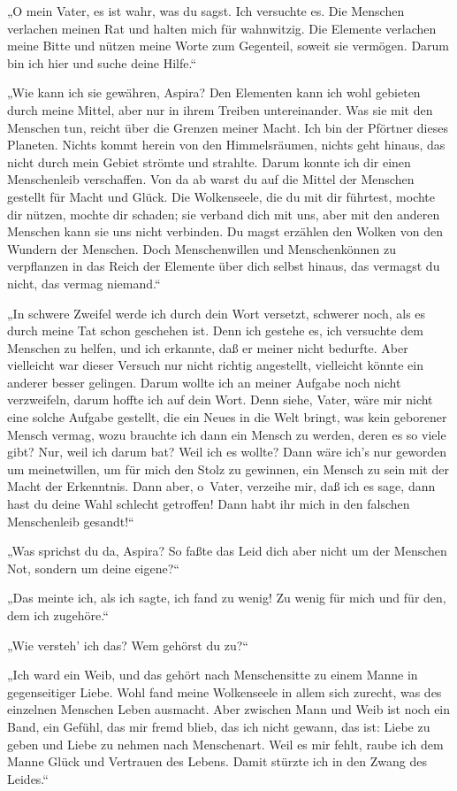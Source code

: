 „O mein Vater, es ist wahr, was du sagst. Ich versuchte es. Die
Menschen verlachen meinen Rat und halten mich für wahnwitzig. Die
Elemente verlachen meine Bitte und nützen meine Worte zum
Gegenteil, soweit sie vermögen. Darum bin ich hier und suche deine
Hilfe.“

„Wie kann ich sie gewähren, Aspira? Den Elementen kann ich wohl
gebieten durch meine Mittel, aber nur in ihrem Treiben
untereinander. Was sie mit den Menschen tun, reicht über die
Grenzen meiner Macht. Ich bin der Pförtner dieses Planeten. Nichts
kommt herein von den Himmelsräumen, nichts geht hinaus, das nicht
durch mein Gebiet strömte und strahlte. Darum konnte ich dir einen
Menschenleib verschaffen. Von da ab warst du auf die Mittel der
Menschen gestellt für Macht und Glück. Die Wolkenseele, die du mit
dir führtest, mochte dir nützen, mochte dir schaden; sie verband
dich mit uns, aber mit den anderen Menschen kann sie uns nicht
verbinden. Du magst erzählen den Wolken von den Wundern der
Menschen. Doch Menschenwillen und Menschenkönnen zu verpflanzen in
das Reich der Elemente über dich selbst hinaus, das vermagst du
nicht, das vermag niemand.“

„In schwere Zweifel werde ich durch dein Wort versetzt, schwerer
noch, als es durch meine Tat schon geschehen ist. Denn ich gestehe
es, ich versuchte dem Menschen zu helfen, und ich erkannte, daß er
meiner nicht bedurfte. Aber vielleicht war dieser Versuch nur nicht
richtig angestellt, vielleicht könnte ein anderer besser gelingen.
Darum wollte ich an meiner Aufgabe noch nicht verzweifeln, darum
hoffte ich auf dein Wort. Denn siehe, Vater, wäre mir nicht eine
solche Aufgabe gestellt, die ein Neues in die Welt bringt, was kein
geborener Mensch vermag, wozu brauchte ich dann ein Mensch zu
werden, deren es so viele gibt? Nur, weil ich darum bat? Weil ich
es wollte? Dann wäre ich's nur geworden um meinetwillen, um für
mich den Stolz zu gewinnen, ein Mensch zu sein mit der Macht der
Erkenntnis. Dann aber, o~Vater, verzeihe mir, daß ich es sage, dann
hast du deine Wahl schlecht getroffen! Dann habt ihr mich in den
falschen Menschenleib gesandt!“

„Was sprichst du da, Aspira? So faßte das Leid dich aber nicht um
der Menschen Not, sondern um deine eigene?“

„Das meinte ich, als ich sagte, ich fand zu wenig! Zu wenig für
mich und für den, dem ich zugehöre.“

„Wie versteh' ich das? Wem gehörst du zu?“

„Ich ward ein Weib, und das gehört nach Menschensitte zu einem
Manne in gegenseitiger Liebe. Wohl fand meine Wolkenseele in allem
sich zurecht, was des einzelnen Menschen Leben ausmacht. Aber
zwischen Mann und Weib ist noch ein Band, ein Gefühl, das mir fremd
blieb, das ich nicht gewann, das ist: Liebe zu geben und Liebe zu
nehmen nach Menschenart. Weil es mir fehlt, raube ich dem Manne
Glück und Vertrauen des Lebens. Damit stürzte ich in den Zwang des
Leides.“

